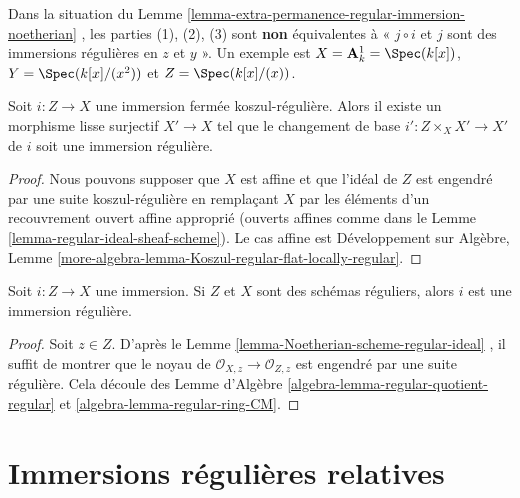 \begin{remark}
\label{remark-not-always-extra-permanence}
Dans la situation du Lemme  \ref{lemma-extra-permanence-regular-immersion-noetherian} , les parties (1), (2), (3) sont
 {\bf  non }  équivalentes à « $j \circ i$  et
 $j$  sont des immersions régulières en  $z$  et  $y$ ». Un
exemple est  $X = \mathbf{A}^1_k = \Spec(k[x])$,  $Y = \Spec(k[x]/(x^2))$  et  $Z = \Spec(k[x]/(x))$.
\end{remark}

\begin{lemma}
\label{lemma-koszul-regular-smooth-locally-regular}
Soit  $i : Z \to X$  une immersion fermée koszul-régulière. Alors il existe un
morphisme lisse surjectif  $X' \to X$  tel que le changement de base  $i' : Z \times_X X' \to X'$ 
de  $i$  soit une immersion régulière.
\end{lemma}

\begin{proof}
Nous pouvons supposer que  $X$  est affine et que l'idéal de  $Z$ 
est engendré par une suite koszul-régulière en remplaçant  $X$  par les
éléments d'un recouvrement ouvert affine approprié (ouverts affines comme dans le
Lemme  \ref{lemma-regular-ideal-sheaf-scheme}). Le cas affine est Développement sur Algèbre, Lemme
 \ref{more-algebra-lemma-Koszul-regular-flat-locally-regular}.
\end{proof}

\begin{lemma}
\label{lemma-immersion-regular-regular-immersion}
Soit  $i : Z \to X$  une immersion. Si  $Z$  et  $X$  sont des schémas
réguliers, alors  $i$  est une immersion régulière.
\end{lemma}

\begin{proof}
Soit  $z \in Z$. D'après le Lemme  \ref{lemma-Noetherian-scheme-regular-ideal} , il suffit de montrer que le
noyau de  $\mathcal{O}_{X, z} \to \mathcal{O}_{Z, z}$  est engendré par une suite régulière. Cela découle des Lemme
d'Algèbre  \ref{algebra-lemma-regular-quotient-regular}  et  \ref{algebra-lemma-regular-ring-CM}.
\end{proof}





\section{Immersions régulières relatives}
\label{section-relative-regular-immersion}

